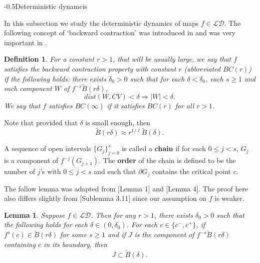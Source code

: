 \documentclass[11pt,oneside]{article}
\makeatletter
\newtheorem{definition}{Definition}[section]
\theoremstyle{plain}
\newtheorem{lem}{Lemma}[section]
\numberwithin{equation}{section}
\numberwithin{figure}{section}
\numberwithin{table}{section}
\renewcommand{\subsection}{\@startsection{subsection}{1}{0mm}
{-\baselineskip}{0.5\baselineskip}{\large\bf\leftline}}
\makeatother
\begin{document}
\subsection{Deterministic dynamcis}


In this subsection we study the deterministic dynamics of maps $f \in \mathcal {LD}$.  The following concept of `backward contraction'  was introduced in \cite{R} and  was very important in \cite{BRSS}.


\begin{definition} 
For a constant $r > 1$, that will be usually large, we say that $f$ satisfies the backward contraction property with constant $r$ (abbreviated $BC(r)$) if the following holds: there exists $\delta_0 >0$ such that for each $\delta < \delta_0$, each $s \geq 1$ and each component $W$ of $f^{-s}\tilde B(r \delta)$, 
\[
dist(W, CV) < \delta \Rightarrow |W| < \delta.
\]
We say that $f$ satisfies $BC(\infty)$ if it satisfies $BC(r)$ for all $r > 1$.
\end{definition}


Note that provided that $\delta$ is small enough, then
\[
\tilde B(r \delta) \approx r^{1/\ell} \tilde B(\delta).
\]


A sequence of open intervals $\{ G_j \}_{j=0}^s$ is called a {\bf chain} if for each $0 \leq j < s$, $G_j$ is a component of $f^{-j}(G_{j+1})$. The {\bf order} of the chain is defined to be the number of $j$'s with $0 \leq j < s$ and such that $\partial G_j$ contains the critical point $c$.


The follow lemma was adapted from \cite{BRSS}[Lemma 1] and \cite{CD}[Lemma 4]. The proof here also differs slightly from \cite{LR}[Sublemma 3.11] since our assumption on $f$ is weaker.


\begin{lem}
Suppose $f \in \mathcal {LD}$. Then for any $r>1$, there exists $\delta_0 >0$ such that the following holds for each $\delta \in (0, \delta_0)$. For each $c \in \{c^-, c^+ \}$, if $f^s(c) \in \tilde B(r\delta)$  for some $s \geq 1$  and if $J$ is the component of $f^{-s} \tilde B(r\delta)$ containing $c$ in its boundary, then 
\[
J \subset \tilde B(\delta).
\]
\end{lem}
\end{document}
